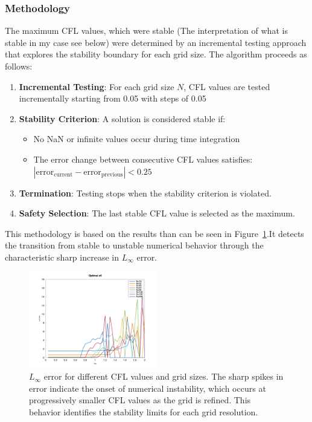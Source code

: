\subsubsection{Methodology}
The maximum CFL values, which were stable (The interpretation of what is stable in my case see below) were determined by an incremental testing approach that explores the stability boundary for each grid size. The algorithm proceeds as follows:
\begin{enumerate}
	\item \textbf{Incremental Testing}: For each grid size $N$, CFL values are tested incrementally starting from 0.05 with steps of 0.05
	\item \textbf{Stability Criterion}: A solution is considered stable if:
	      \begin{itemize}
		      \item No NaN or infinite values occur during time integration
		      \item The error change between consecutive CFL values satisfies: $|\text{error}_{\text{current}} - \text{error}_{\text{previous}}| < 0.25$
	      \end{itemize}
	\item \textbf{Termination}: Testing stops when the stability criterion is violated.
	\item \textbf{Safety Selection}: The last stable CFL value is selected as the maximum.
\end{enumerate}
%
This methodology is based on the results than can be seen in Figure~\ref{fig:error_fc}.It detects the transition from stable to unstable numerical behavior through the characteristic sharp increase in $L_\infty$ error.
\begin{figure}[H]
	\begin{center}
		\includegraphics[width=0.5\textwidth]{media/cfl_errors.png}
	\end{center}
	\caption{$L_{\infty}$ error for different CFL values and grid sizes. The sharp spikes in error indicate the onset of numerical instability, which occurs at progressively smaller CFL values as the grid is refined. This behavior identifies the stability limits for each grid resolution.}\label{fig:error_fc}
\end{figure}

